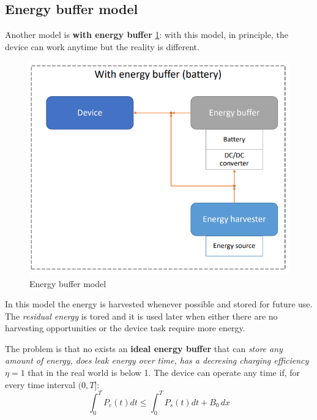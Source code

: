 \documentclass[10pt,a4paper]{report}
\theoremstyle{definition}
\begin{document}
\subsection{Energy buffer model}\label{sec:energy-buffer-model}
Another model is \textbf{with energy buffer} \ref{energy-buffer}: with this model, in principle, the device can work anytime but the reality is different.
\begin{figure}[h]
	\centering\includegraphics[scale=0.40]{images/Pasted image 20230424163729.png}
	\caption{Energy buffer model}
\label{energy-buffer}
\end{figure}

In this model the energy is harvested whenever possible and stored for future use. The \textit{residual energy} is tored and it is used later when either there are no harvesting opportunities or the device task require more energy.

The problem is that no exists an \textbf{ideal energy buffer} that can \textit{store any amount of energy, does leak energy over time, has a decresing charging efficiency $\eta = 1$} that in the real world is below 1.
The device can operate any time if, for every time interval $(0,T]$:
\begin{equation}
	\int_{0}^{T} P_{c}(t)dt \leq \int_{0}^{T} P_{s}(t)dt + B_{0} \,dx
\end{equation}
\end{document}
